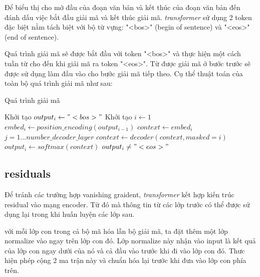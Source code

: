 Để biểu thị cho mở đầu của đoạn văn bản và kết thúc của đoạn văn bản đến đánh dấu việc bắt đầu giải mã và kết thúc giải mã.  \textit{transformer}  sử dụng 2 token đặc biệt nằm tách biệt với bộ từ vựng: "<bos>" (begin of sentence) và "<eos>" (end of sentence).

Quá trình giải mã sẽ được bắt đầu với token "<bos>" và thực hiện một cách tuần từ cho đến khi giải mã ra token "<eos>". Từ được giải mã ở bước trước sẽ được sử dụng làm đầu vào cho bước giải mã tiếp theo. Cụ thể thuật toán của toàn bộ quá trình giải mã như sau:

\begin{algorithm}[H]
    \caption{Quá trình giải mã}
    \begin{algorithmic}[1]
		\State Khởi tạo $output_i \gets "<bos>"$
		\State Khởi tạo $i \gets 1$
		\Do
			\State $embed_i \gets position\_encoding(output_{i-1})$
			\State $context \gets embed_i$
			\For $j = 1...number\_decoder\_layer$
				\State $context \gets decoder(context, masked = i)$
			\EndFor
			\State $output_i \gets softmax(context)$
		\doWhile $output_i \neq "<eos>"$
    \end{algorithmic}
\end{algorithm}


\subsection{residuals}
Để tránh các trường hợp vanishing graident,  \textit{transformer}  kết hợp kiến trúc residual vào mạng encoder. Từ đó mà thông tin từ các lớp trước có thể được sử dụng lại trong khi huấn luyện các lớp sau.

với mỗi lớp con trong cả bộ mã hóa lẫn bộ giải mã, ta đặt thêm một lớp normalize vào ngay trên lớp con đó. Lớp normalize này nhận vào input là kết quả của lớp con ngay dưới của nó và cả đầu vào trước khi đi vào lớp con đó. Thưc hiện phép cộng 2 ma trận này và chuẩn hóa lại trước khi đưa vào lớp con phía trên.

